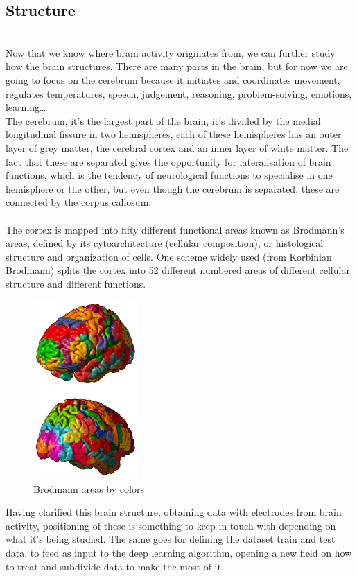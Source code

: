 \subsection{Structure}
\label{subsec-structure}
\leavevmode\\
Now that we know where brain activity originates from, we can further study how the brain structures. There are many parts in the brain, but for now we are going to focus on the cerebrum because it initiates and coordinates movement, regulates temperatures, speech, judgement, reasoning, problem-solving, emotions, learning…
\\
The cerebrum\cite{Cerebrum}, it’s the largest part of the brain, it’s divided by the medial longitudinal fissure in two hemispheres, each of these hemispheres has an outer layer of grey matter, the cerebral cortex and an inner layer of white matter. The fact that these are separated gives the opportunity for lateralisation of brain functions, which is the tendency of neurological functions to specialise in one hemisphere or the other, but even though the cerebrum\cite{Cerebrum} is separated, these are connected by the corpus callosum.
\\
\\
The cortex is mapped into fifty different functional areas known as Brodmann’s areas\cite{Brodmannarea}, defined by its cytoarchitecture (cellular composition), or histological structure and organization of cells. One scheme widely used (from Korbinian Brodmann)\cite{Brodmannarea} splits the cortex into 52 different numbered areas of different cellular structure and different functions.
\\
\begin{figure}[h]
  \caption{Brodmann areas by colors}
  \centering
  \includegraphics[width=4cm]{img/Brodmann_areas.png}
\end{figure}


Having clarified this brain structure, obtaining data with electrodes from brain activity, positioning of these is something to keep in touch with depending on what it’s being studied. The same goes for defining the dataset train and test data, to feed as input to the deep learning algorithm, opening a new field on how to treat and subdivide data to make the most of it.
\\
